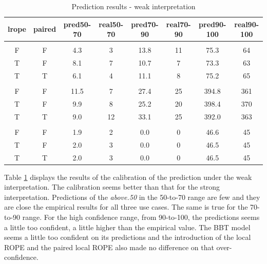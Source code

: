 \documentclass[twoside,11pt,preprint]{article}
\begin{document}
\begin{table}

\caption{\label{tab:predxz2}\label{tab:predw}Prediction results - weak interpretation}
\centering
\begin{tabular}[t]{cccccccc}
\toprule
\textbf{lrope} & \textbf{paired} & \textbf{pred50-70} & \textbf{real50-70} & \textbf{pred70-90} & \textbf{real70-90} & \textbf{pred90-100} & \textbf{real90-100}\\
\midrule
\addlinespace[0.3em]
\multicolumn{8}{l}{\textbf{ss}}\\
\hspace{1em}F & F & 4.3 & 3 & 13.8 & 11 & 75.3 & 64\\
\hspace{1em}T & F & 8.1 & 7 & 10.7 & 7 & 73.3 & 63\\
\hspace{1em}T & T & 6.1 & 4 & 11.1 & 8 & 75.2 & 65\\
\addlinespace[0.3em]
\multicolumn{8}{l}{\textbf{mm}}\\
\hspace{1em}F & F & 11.5 & 7 & 27.4 & 25 & 394.8 & 361\\
\hspace{1em}T & F & 9.9 & 8 & 25.2 & 20 & 398.4 & 370\\
\hspace{1em}T & T & 9.0 & 12 & 33.1 & 25 & 392.0 & 363\\
\addlinespace[0.3em]
\multicolumn{8}{l}{\textbf{sl}}\\
\hspace{1em}F & F & 1.9 & 2 & 0.0 & 0 & 46.6 & 45\\
\hspace{1em}T & F & 2.0 & 3 & 0.0 & 0 & 46.5 & 45\\
\hspace{1em}T & T & 2.0 & 3 & 0.0 & 0 & 46.5 & 45\\
\bottomrule
\end{tabular}
\end{table}

Table \ref{tab:predw} displays the results of the calibration of the
prediction under the weak interpretation. The calibration seems better
than that for the strong interpretation. Predictions of the {\em above.50}
in the 50-to-70 range are few and they are close the empirical results for
all three use cases. The same is true for the 70-to-90 range. For the
high confidence range, from 90-to-100, the predictions seems a little
too confident, a little higher than the empirical value. The BBT model seems a little too confident on
its predictions and the introduction of the local ROPE and the paired
local ROPE also made no difference on that over-confidence.
\end{document}
